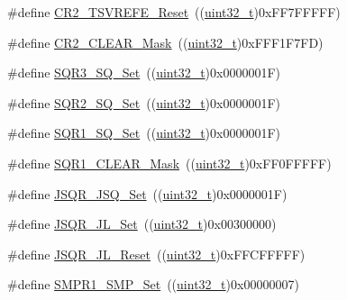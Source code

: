 \begin{DoxyCompactItemize}
\item 
\#define \hyperlink{group___a_d_c___private___defines_gaa207bc0eeed8b546dc9536b02df633b5}{C\+R2\+\_\+\+T\+S\+V\+R\+E\+F\+E\+\_\+\+Reset}~((\hyperlink{_p_e___types_8h_a33594304e786b158f3fb30289278f5af}{uint32\+\_\+t})0x\+F\+F7\+F\+F\+F\+F\+F)
\item 
\#define \hyperlink{group___a_d_c___private___defines_ga49192361afb92aee0e3f1124ef1131a0}{C\+R2\+\_\+\+C\+L\+E\+A\+R\+\_\+\+Mask}~((\hyperlink{_p_e___types_8h_a33594304e786b158f3fb30289278f5af}{uint32\+\_\+t})0x\+F\+F\+F1\+F7\+F\+D)
\item 
\#define \hyperlink{group___a_d_c___private___defines_ga8a04f115021dc5261562b4dc04c01109}{S\+Q\+R3\+\_\+\+S\+Q\+\_\+\+Set}~((\hyperlink{_p_e___types_8h_a33594304e786b158f3fb30289278f5af}{uint32\+\_\+t})0x0000001\+F)
\item 
\#define \hyperlink{group___a_d_c___private___defines_ga2329f779aee00e5990d6430a01de8cb0}{S\+Q\+R2\+\_\+\+S\+Q\+\_\+\+Set}~((\hyperlink{_p_e___types_8h_a33594304e786b158f3fb30289278f5af}{uint32\+\_\+t})0x0000001\+F)
\item 
\#define \hyperlink{group___a_d_c___private___defines_ga91fb5f63b765a543dfa419ea0219351b}{S\+Q\+R1\+\_\+\+S\+Q\+\_\+\+Set}~((\hyperlink{_p_e___types_8h_a33594304e786b158f3fb30289278f5af}{uint32\+\_\+t})0x0000001\+F)
\item 
\#define \hyperlink{group___a_d_c___private___defines_ga6e3e238f38d7ff17939cbd5417fc51cc}{S\+Q\+R1\+\_\+\+C\+L\+E\+A\+R\+\_\+\+Mask}~((\hyperlink{_p_e___types_8h_a33594304e786b158f3fb30289278f5af}{uint32\+\_\+t})0x\+F\+F0\+F\+F\+F\+F\+F)
\item 
\#define \hyperlink{group___a_d_c___private___defines_ga5d460390dbe3b400b5e0fdf1e94929f0}{J\+S\+Q\+R\+\_\+\+J\+S\+Q\+\_\+\+Set}~((\hyperlink{_p_e___types_8h_a33594304e786b158f3fb30289278f5af}{uint32\+\_\+t})0x0000001\+F)
\item 
\#define \hyperlink{group___a_d_c___private___defines_ga46af9e738702305be0127f6c15c4f7b0}{J\+S\+Q\+R\+\_\+\+J\+L\+\_\+\+Set}~((\hyperlink{_p_e___types_8h_a33594304e786b158f3fb30289278f5af}{uint32\+\_\+t})0x00300000)
\item 
\#define \hyperlink{group___a_d_c___private___defines_gac8d1173791ea10bac7c53a368d593a16}{J\+S\+Q\+R\+\_\+\+J\+L\+\_\+\+Reset}~((\hyperlink{_p_e___types_8h_a33594304e786b158f3fb30289278f5af}{uint32\+\_\+t})0x\+F\+F\+C\+F\+F\+F\+F\+F)
\item 
\#define \hyperlink{group___a_d_c___private___defines_ga244048ec3ba9461a6609942def9a15ba}{S\+M\+P\+R1\+\_\+\+S\+M\+P\+\_\+\+Set}~((\hyperlink{_p_e___types_8h_a33594304e786b158f3fb30289278f5af}{uint32\+\_\+t})0x00000007)

\end{DoxyCompactItemize}
